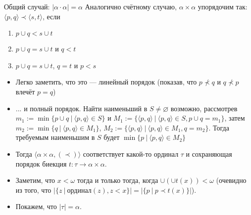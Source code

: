 \documentclass[aspectratio=169]{beamer}
\begin{document}
\begin{frame}{Общий случай: $|\alpha \cdot \alpha| = \alpha$}
Аналогично счётному случаю, $\alpha \times \alpha$ упорядочим так: $\langle p,q \rangle \prec \langle s,t \rangle$,
если \begin{enumerate}
\item $p \cup q < s \cup t$
\item $p \cup q = s \cup t$ и $q < t$
\item $p \cup q = s \cup t$, $q = t$ и $p < s$
\end{enumerate}
\begin{itemize}
\item Легко заметить, что это --- линейный порядок (показав, что $p \not\prec q$ и $q \not\prec p$ влечёт $p = q$)
\item ... и полный порядок. Найти наименьший в $S \ne \varnothing$ возможно, рассмотрев $m_1 := \min \{ p \cup q\ |\ \langle p,q \rangle \in S\}$ и
$M_1 := \{ \langle p,q\rangle\ |\ \langle p,q \rangle \in S, p \cup q = m_1\}$,
затем $m_2 := \min \{q\ |\ \langle p,q \rangle \in M_1 \}$,
$M_2 := \{\langle p,q\rangle\ |\ \langle p,q \rangle \in M_1, q = m_2\}$.
Тогда требуемым наименьшим в $S$ будет $\min \{ p\ |\ \langle p,q \rangle \in M_2\}$
\item Тогда $\langle \alpha\times\alpha, (\prec)\rangle$ соответствует какой-то ординал $\tau$ 
и сохраняющая порядок биекция $t: \tau\rightarrow\alpha\times\alpha$. 
\item Заметим, что $x < \omega$ тогда и только тогда, когда $\cup(\cup t(x)) < \omega$
(очевидно из того, что $|\{z\ |\ \text{ординал}(z), z < x\}|=|\{p\ |\ p \prec t(x)\}|$).
\item Покажем, что $|\tau| = \alpha$.
\end{itemize}
\end{frame}
\end{document}
